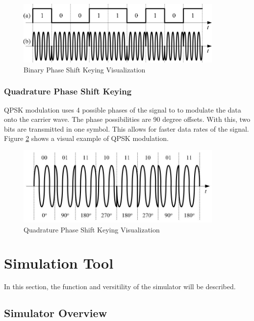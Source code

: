 \documentclass[12pt]{report}
\begin{document}
\begin{figure}[h]
    \centering
    \includegraphics[width=4.0in]{Example-of-BPSK-modulation-format-a-binary-signal-and-b-BPSK-modulated-signal.png}
    \caption{Binary Phase Shift Keying Visualization \cite{mahdirajiAdvancedModulationFormats2010} }
    \label{fig:BPSKsig}
\end{figure}
\subsection{Quadrature Phase Shift Keying}
\label{sec:QPSK}

QPSK modulation uses 4 possible phases of the signal to to modulate the data onto the carrier wave. The phase possibilities are 90 degree offsets. With this, two bits are transmitted in one symbol. This allows for faster data rates of the signal. Figure \ref{fig:QPSKmod} shows a visual example of QPSK modulation.

\begin{figure}[h]
    \centering
    \includegraphics[width=4.0in]{QPSK_sig.JPG}
    \caption{Quadrature Phase Shift Keying Visualization \cite{mahdirajiAdvancedModulationFormats2010} }
    \label{fig:QPSKmod}
\end{figure}


\chapter {Simulation Tool}
In this section, the function and versitility of the simulator will be described.

\section{Simulator Overview}
\end{document}
